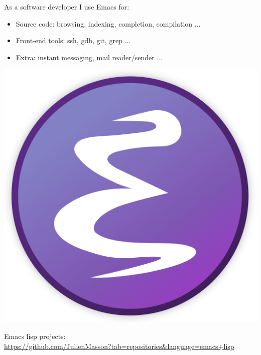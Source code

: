 \documentclass[letterpaper]{jm-cv} %
\begin{document}
\begin{minipage}{.7\textwidth}
  As a software developer I use Emacs for:
  \begin{itemize}
  \item[\color{mainblue}\faArrowRight] Source code: browsing, indexing, completion, compilation ...
  \item[\color{mainblue}\faArrowRight] Front-end tools: ssh, gdb, git, grep ...
  \item[\color{mainblue}\faArrowRight] Extra: instant messaging, mail reader/sender ...
  \end{itemize}
\end{minipage}%
\begin{minipage}{.3\textwidth}
  \center
  \includegraphics[scale=0.02]{logo-emacs.png}
\end{minipage}
\vspace{0.2cm}

Emacs lisp projects:\\
\url{https://github.com/JulienMasson?tab=repositories\&language=emacs+lisp}


\end{document}
